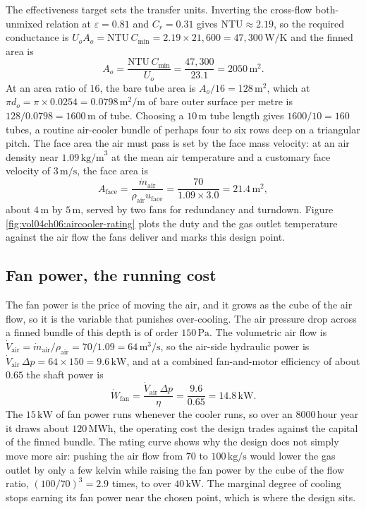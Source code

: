 The effectiveness target sets the transfer units. Inverting the cross-flow
both-unmixed relation at $\varepsilon = 0.81$ and $C_r = 0.31$ gives
$\text{NTU} \approx 2.19$, so the required conductance is $U_o A_o = \text{NTU}\,
C_{\min} = 2.19\times 21{,}600 = 47{,}300\,\text{W}/\si{\kelvin}$ and the finned
area is
\[
A_o = \frac{\text{NTU}\,C_{\min}}{U_o} = \frac{47{,}300}{23.1} = 2050\,\text{m}^2.
\]
At an area ratio of $16$, the bare tube area is $A_o/16 = 128\,\text{m}^2$, which
at $\pi d_o = \pi\times 0.0254 = 0.0798\,\text{m}^2/\text{m}$ of bare outer surface
per metre is $128/0.0798 = 1600\,\text{m}$ of tube. Choosing a $10\,\text{m}$ tube
length gives $1600/10 = 160$ tubes, a routine air-cooler bundle of perhaps four to
six rows deep on a triangular pitch. The face area the air must pass is set by the
face mass velocity: at an air density near $1.09\,\text{kg/m}^3$ at the mean air
temperature and a customary face velocity of $3\,\text{m/s}$, the face area is
\[
A_{\text{face}} = \frac{\dot{m}_{\text{air}}}{\rho_{\text{air}} u_{\text{face}}}
= \frac{70}{1.09\times 3.0} = 21.4\,\text{m}^2,
\]
about $4\,\text{m}$ by $5\,\text{m}$, served by two fans for redundancy and
turndown. Figure \ref{fig:vol04ch06:aircooler-rating} plots the duty and the gas
outlet temperature against the air flow the fans deliver and marks this design
point.



\subsection{Fan power, the running cost}

The fan power is the price of moving the air, and it grows as the cube of the air
flow, so it is the variable that punishes over-cooling. The air pressure drop
across a finned bundle of this depth is of order $150\,\text{Pa}$. The volumetric
air flow is $\dot{V}_{\text{air}} = \dot{m}_{\text{air}}/\rho_{\text{air}} =
70/1.09 = 64\,\text{m}^3/\text{s}$, so the air-side hydraulic power is
$\dot{V}_{\text{air}}\,\Delta p = 64\times 150 = 9.6\,\text{kW}$, and at a combined
fan-and-motor efficiency of about $0.65$ the shaft power is
\[
\dot{W}_{\text{fan}} = \frac{\dot{V}_{\text{air}}\,\Delta p}{\eta} =
\frac{9.6}{0.65} = 14.8\,\text{kW}.
\]
The $15\,\text{kW}$ of fan power runs whenever the cooler runs, so over an
$8000\,\text{hour}$ year it draws about $120\,\text{MWh}$, the operating cost the
design trades against the capital of the finned bundle. The rating curve shows why
the design does not simply move more air: pushing the air flow from $70$ to
$100\,\text{kg/s}$ would lower the gas outlet by only a few kelvin while raising
the fan power by the cube of the flow ratio, $(100/70)^3 = 2.9$ times, to over
$40\,\text{kW}$. The marginal degree of cooling stops earning its fan power near
the chosen point, which is where the design sits.

